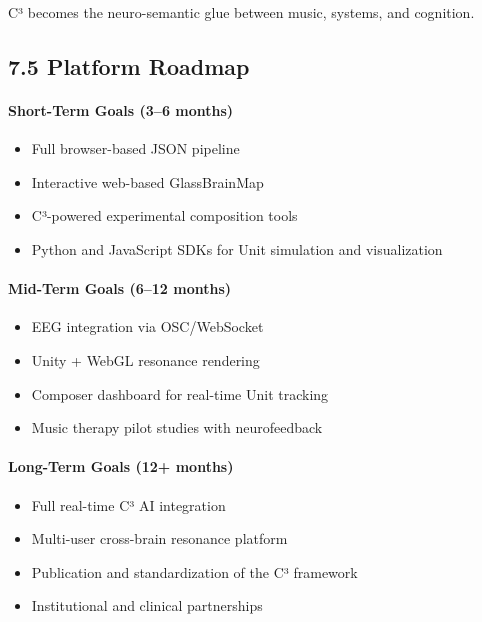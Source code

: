 C³ becomes the neuro-semantic glue between music, systems, and cognition.

\subsection*{7.5 Platform Roadmap}

\paragraph{Short-Term Goals (3–6 months)}

\begin{itemize}
    \item Full browser-based JSON pipeline
    \item Interactive web-based GlassBrainMap
    \item C³-powered experimental composition tools
    \item Python and JavaScript SDKs for Unit simulation and visualization
\end{itemize}

\paragraph{Mid-Term Goals (6–12 months)}

\begin{itemize}
    \item EEG integration via OSC/WebSocket
    \item Unity + WebGL resonance rendering
    \item Composer dashboard for real-time Unit tracking
    \item Music therapy pilot studies with neurofeedback
\end{itemize}

\paragraph{Long-Term Goals (12+ months)}

\begin{itemize}
    \item Full real-time C³ AI integration
    \item Multi-user cross-brain resonance platform
    \item Publication and standardization of the C³ framework
    \item Institutional and clinical partnerships
\end{itemize}

